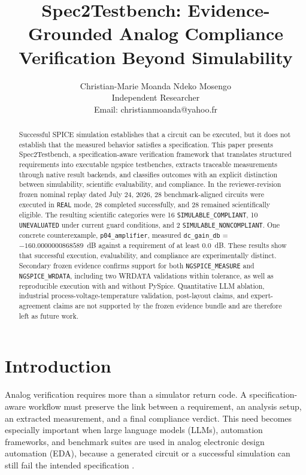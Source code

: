 \documentclass[conference]{IEEEtran}%
\title{Spec2Testbench: Evidence-Grounded Analog Compliance Verification Beyond Simulability}
\author{%
Christian-Marie Moanda Ndeko Mosengo\\
Independent Researcher\\
Email: christianmoanda@yahoo.fr
}
\begin{document}
\maketitle

\begin{abstract}
Successful SPICE simulation establishes that a circuit can be executed, but it does not establish that the measured behavior satisfies a specification. This paper presents Spec2Testbench, a specification-aware verification framework that translates structured requirements into executable ngspice testbenches, extracts traceable measurements through native result backends, and classifies outcomes with an explicit distinction between simulability, scientific evaluability, and compliance. In the reviewer-revision frozen nominal replay dated July 24, 2026, 28 benchmark-aligned circuits were executed in \texttt{REAL} mode, 28 completed successfully, and 28 remained scientifically eligible. The resulting scientific categories were 16 \texttt{SIMULABLE\_COMPLIANT}, 10 \texttt{UNEVALUATED} under current guard conditions, and 2 \texttt{SIMULABLE\_NONCOMPLIANT}. One concrete counterexample, \texttt{p04\_amplifier}, measured \texttt{dc\_gain\_db} = $-160.0000000868589$~dB against a requirement of at least $0.0$~dB. These results show that successful execution, evaluability, and compliance are experimentally distinct. Secondary frozen evidence confirms support for both \texttt{NGSPICE\_MEASURE} and \texttt{NGSPICE\_WRDATA}, including two WRDATA validations within tolerance, as well as reproducible execution with and without PySpice. Quantitative LLM ablation, industrial process-voltage-temperature validation, post-layout claims, and expert-agreement claims are not supported by the frozen evidence bundle and are therefore left as future work.
\end{abstract}

\section{Introduction}
Analog verification requires more than a simulator return code. A specification-aware workflow must preserve the link between a requirement, an analysis setup, an extracted measurement, and a final compliance verdict. This need becomes especially important when large language models (LLMs), automation frameworks, and benchmark suites are used in analog electronic design automation (EDA), because a generated circuit or a successful simulation can still fail the intended specification \cite{analogcoder_2024,analogcoderpro_2025,analogtester_2025,llm4eda_2023,chateda_2023}.
\end{document}
